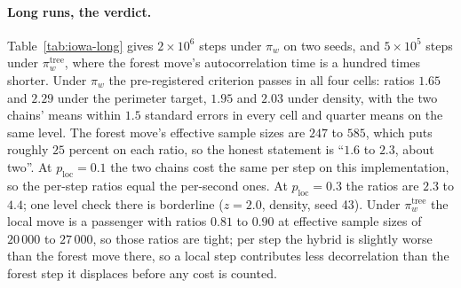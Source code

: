 \documentclass[11pt]{article}
\begin{document}
\paragraph{Long runs, the verdict.} Table~\ref{tab:iowa-long} gives
$2 \times 10^6$ steps under $\pi_w$ on two seeds, and $5 \times 10^5$
steps under $\pi_w^{\mathrm{tree}}$, where the forest move's
autocorrelation time is a hundred times shorter. Under $\pi_w$ the
pre-registered criterion passes in all four cells: ratios $1.65$ and
$2.29$ under the perimeter target, $1.95$ and $2.03$ under density,
with the two chains' means within $1.5$ standard errors in every cell
and quarter means on the same level. The forest move's effective
sample sizes are $247$ to $585$, which puts roughly $25$ percent on
each ratio, so the honest statement is ``$1.6$ to $2.3$, about two''.
At $p_{\mathrm{loc}} = 0.1$ the two chains cost the same per step on
this implementation, so the per-step ratios equal the per-second
ones. At $p_{\mathrm{loc}} = 0.3$ the ratios are $2.3$ to $4.4$; one level
check there is borderline ($z = 2.0$, density, seed 43). Under
$\pi_w^{\mathrm{tree}}$ the local move is a passenger with ratios
$0.81$ to $0.90$ at effective sample sizes of $20\,000$ to $27\,000$,
so those ratios are tight; per step the hybrid is slightly worse than
the forest move there, so a local step contributes less decorrelation
than the forest step it displaces before any cost is counted.
\end{document}
